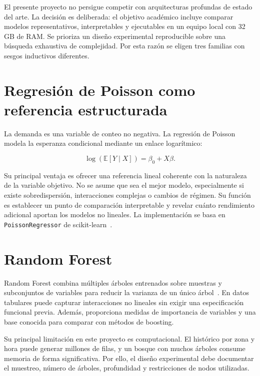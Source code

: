 El presente proyecto no persigue competir con arquitecturas profundas de estado del arte. La decisión es deliberada: el objetivo académico incluye comparar modelos representativos, interpretables y ejecutables en un equipo local con 32 GB de RAM\@. Se prioriza un diseño experimental reproducible sobre una búsqueda exhaustiva de complejidad. Por esta razón se eligen tres familias con sesgos inductivos diferentes.

\section{Regresión de Poisson como referencia estructurada}

La demanda es una variable de conteo no negativa. La regresión de Poisson modela la esperanza condicional mediante un enlace logarítmico:

\begin{equation}
\log \left( \mathbb{E}[Y\mid X] \right) = \beta_0 + X\beta.
\end{equation}

Su principal ventaja es ofrecer una referencia lineal coherente con la naturaleza de la variable objetivo. No se asume que sea el mejor modelo, especialmente si existe sobredispersión, interacciones complejas o cambios de régimen. Su función es establecer un punto de comparación interpretable y revelar cuánto rendimiento adicional aportan los modelos no lineales. La implementación se basa en \texttt{PoissonRegressor} de scikit-learn~\cite{sklearn_poisson,pedregosa2011}.

\section{Random Forest}

Random Forest combina múltiples árboles entrenados sobre muestras y subconjuntos de variables para reducir la varianza de un único árbol~\cite{breiman2001}. En datos tabulares puede capturar interacciones no lineales sin exigir una especificación funcional previa. Además, proporciona medidas de importancia de variables y una base conocida para comparar con métodos de boosting.

Su principal limitación en este proyecto es computacional. El histórico por zona y hora puede generar millones de filas, y un bosque con muchos árboles consume memoria de forma significativa. Por ello, el diseño experimental debe documentar el muestreo, número de árboles, profundidad y restricciones de nodos utilizadas.

